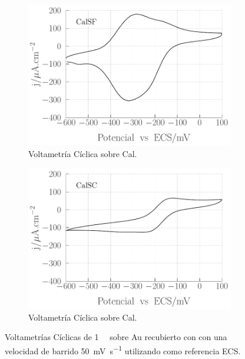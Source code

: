 						\begin{figure}[th]
				 	   	    \begin{subfigure}[t]{0.495\textwidth}
				        	\includegraphics[width=\textwidth]{Graficos/SF-accesibilidad.pdf}
				       		\caption{Voltametría Cíclica sobre Cal\pdmF.}
				         	\end{subfigure}
				         	\begin{subfigure}[t]{0.495\textwidth}
				        	\includegraphics[width=\textwidth]{Graficos/SC-accesibilidad.pdf}
				       		\caption{Voltametría Cíclica sobre Cal\pdmC.}
				         	\end{subfigure}
				     		\caption[Accesibilidad electrodo de trabajo.]{Voltametrías Cíclicas de \aminorutenio\space \SI{1}{\milli\Molar} sobre Au recubierto con \pdm\space con una velocidad de barrido \SI{50}{\milli\volt\per\second} utilizando como referencia ECS.}
				     		\label{fig:accesibilidad}
				     		\end{figure}
	
